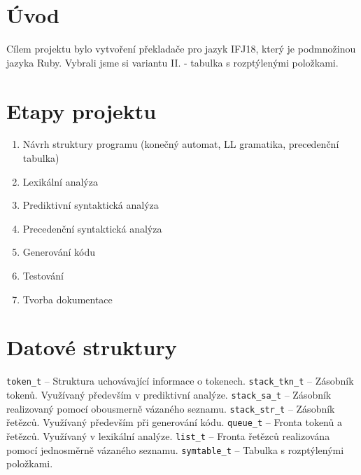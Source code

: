 \documentclass[11pt, a4paper]{article}
\begin{document}
\section{Úvod}
Cílem projektu bylo vytvoření překladače pro jazyk IFJ18, který je podmnožinou jazyka Ruby. Vybrali jsme si variantu II. - tabulka s rozptýlenými položkami.

\section{Etapy projektu}
\begin{enumerate}
  \item Návrh struktury programu (konečný automat, LL gramatika, precedenční tabulka)
  \vspace{-0.6em}
  \item Lexikální analýza
  \vspace{-0.6em}
  \item Prediktivní syntaktická analýza 
  \vspace{-0.6em}
  \item Precedenční syntaktická analýza 
  \vspace{-0.6em}
  \item Generování kódu
  \vspace{-0.6em}
  \item Testování
  \vspace{-0.6em}
  \item Tvorba dokumentace
  \vspace{-0.6em}
\end{enumerate}


\section{Datové struktury}
\verb|token_t| -- Struktura uchovávající informace o tokenech. \newline
\verb|stack_tkn_t| -- Zásobník tokenů. Využívaný především v prediktivní analýze. \newline
\verb|stack_sa_t| -- Zásobník realizovaný pomocí obousmerně vázaného seznamu. \newline
\verb|stack_str_t| -- Zásobník řetězců. Využívaný především při generování kódu. \newline
\verb|queue_t| -- Fronta tokenů a řetězců. Využívaný v lexikální analýze.\newline
\verb|list_t| -- Fronta řetězců realizována pomocí jednosměrně vázaného seznamu.\newline
\verb|symtable_t| -- Tabulka s rozptýlenými položkami.\newline
\end{document}

